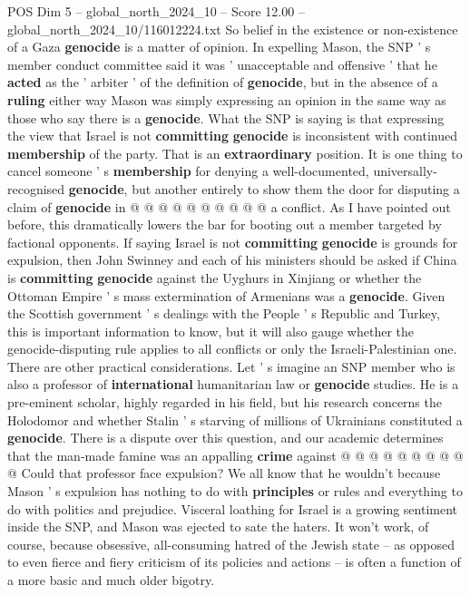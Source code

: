 \begin{textsample}{POS Dim 5 – global\_north\_2024\_10 – Score 12.00 – global\_north\_2024\_10/116012224.txt}
So belief in the existence or non-existence of a Gaza \textbf{genocide} is a matter of opinion.
In expelling Mason, the SNP ' s member conduct committee said it was ' unacceptable and offensive ' that he \textbf{acted} as the ' arbiter ' of the definition of \textbf{genocide}, but in the absence of a \textbf{ruling} either way Mason was simply expressing an opinion in the same way as those who say there is a \textbf{genocide}.
What the SNP is saying is that expressing the view that Israel is not \textbf{committing} \textbf{genocide} is inconsistent with continued \textbf{membership} of the party.
That is an \textbf{extraordinary} position.
It is one thing to cancel someone ' s \textbf{membership} for denying a well-documented, universally-recognised \textbf{genocide}, but another entirely to show them the door for disputing a claim of \textbf{genocide} in @ @ @ @ @ @ @ @ @ @ a conflict.
As I have pointed out before, this dramatically lowers the bar for booting out a member targeted by factional opponents.
If saying Israel is not \textbf{committing} \textbf{genocide} is grounds for expulsion, then John Swinney and each of his ministers should be asked if China is \textbf{committing} \textbf{genocide} against the Uyghurs in Xinjiang or whether the Ottoman Empire ' s mass extermination of Armenians was a \textbf{genocide}.
Given the Scottish government ' s dealings with the People ' s Republic and Turkey, this is important information to know, but it will also gauge whether the genocide-disputing rule applies to all conflicts or only the Israeli-Palestinian one.
There are other practical considerations.
Let ' s imagine an SNP member who is also a professor of \textbf{international} humanitarian law or \textbf{genocide} studies.
He is a pre-eminent scholar, highly regarded in his field, but his research concerns the Holodomor and whether Stalin ' s starving of millions of Ukrainians constituted a \textbf{genocide}.
There is a dispute over this question, and our academic determines that the man-made famine was an appalling \textbf{crime} against @ @ @ @ @ @ @ @ @ @ Could that professor face expulsion?
We all know that he wouldn't because Mason ' s expulsion has nothing to do with \textbf{principles} or rules and everything to do with politics and prejudice.
Visceral loathing for Israel is a growing sentiment inside the SNP, and Mason was ejected to sate the haters.
It won't work, of course, because obsessive, all-consuming hatred of the Jewish state -- as opposed to even fierce and fiery criticism of its policies and actions -- is often a function of a more basic and much older bigotry.

\end{textsample}
